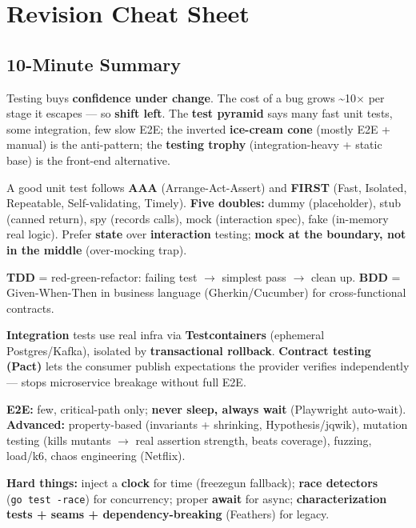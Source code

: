 \documentclass[11pt]{article}
\begin{document}
\section{Revision Cheat Sheet}\label{revision-cheat-sheet}

\subsection{10-Minute Summary}\label{10-minute-summary}

Testing buys \textbf{confidence under change}. The cost of a bug grows \textasciitilde10\(\times\) per stage it escapes --- so \textbf{shift left}. The \textbf{test pyramid} says many fast unit tests, some integration, few slow E2E; the inverted \textbf{ice-cream cone} (mostly E2E + manual) is the anti-pattern; the \textbf{testing trophy} (integration-heavy + static base) is the front-end alternative.

A good unit test follows \textbf{AAA} (Arrange-Act-Assert) and \textbf{FIRST} (Fast, Isolated, Repeatable, Self-validating, Timely). \textbf{Five doubles:} dummy (placeholder), stub (canned return), spy (records calls), mock (interaction spec), fake (in-memory real logic). Prefer \textbf{state} over \textbf{interaction} testing; \textbf{mock at the boundary, not in the middle} (over-mocking trap).

\textbf{TDD} = red-green-refactor: failing test \(\rightarrow\) simplest pass \(\rightarrow\) clean up. \textbf{BDD} = Given-When-Then in business language (Gherkin/Cucumber) for cross-functional contracts.

\textbf{Integration} tests use real infra via \textbf{Testcontainers} (ephemeral Postgres/Kafka), isolated by \textbf{transactional rollback}. \textbf{Contract testing (Pact)} lets the consumer publish expectations the provider verifies independently --- stops microservice breakage without full E2E.

\textbf{E2E:} few, critical-path only; \textbf{never sleep, always wait} (Playwright auto-wait). \textbf{Advanced:} property-based (invariants + shrinking, Hypothesis/jqwik), mutation testing (kills mutants \(\rightarrow\) real assertion strength, beats coverage), fuzzing, load/k6, chaos engineering (Netflix).

\textbf{Hard things:} inject a \textbf{clock} for time (freezegun fallback); \textbf{race detectors} (\texttt{go\ test\ -race}) for concurrency; proper \textbf{await} for async; \textbf{characterization tests + seams + dependency-breaking} (Feathers) for legacy.
\end{document}
